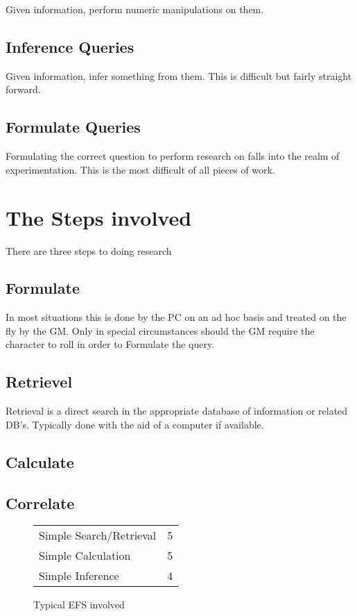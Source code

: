 Given information, perform numeric manipulations on them.

\subsection{Inference Queries}

Given information, infer something from them. This is difficult but
fairly straight forward.

\subsection{Formulate Queries}

Formulating the correct question to perform research on falls into 
the realm of experimentation. This is the most difficult of all 
pieces of work.

\section{The Steps involved}

There are three steps to doing research 

\subsection{Formulate}
In most situations this is done by the PC on an ad hoc basis and
treated on the fly by the GM. Only in special circumstances should the GM
require the character to roll in order to Formulate the query.

\subsection{Retrievel}

Retrieval is a direct search in the appropriate database of
information or related DB's. Typically done with the aid of a
computer if available.

\subsection{Calculate}

\subsection{Correlate}

\begin{figure}[htb]
\caption{Typical EFS involved}
	\begin{tabular}{||l|l||} \hline
	Simple Search/Retrieval   &  5 \\
	Simple Calculation        &  5 \\
	Simple Inference          &  4 \\ \hline
	\end{tabular}
\end{figure}

